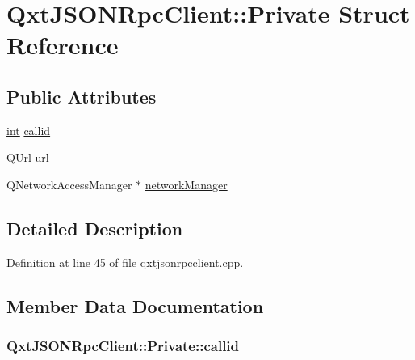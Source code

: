 \hypertarget{struct_qxt_j_s_o_n_rpc_client_1_1_private}{\section{Qxt\-J\-S\-O\-N\-Rpc\-Client\-:\-:Private Struct Reference}
\label{struct_qxt_j_s_o_n_rpc_client_1_1_private}
}
\subsection*{Public Attributes}
\begin{DoxyCompactItemize}
\item 
\hyperlink{ioapi_8h_a787fa3cf048117ba7123753c1e74fcd6}{int} \hyperlink{struct_qxt_j_s_o_n_rpc_client_1_1_private_aab2c2e58f64aeba9d949bcaa643b2fae}{callid}
\item 
Q\-Url \hyperlink{struct_qxt_j_s_o_n_rpc_client_1_1_private_adf7b52dc1d061e3b2afcaf11da4c1529}{url}
\item 
Q\-Network\-Access\-Manager $\ast$ \hyperlink{struct_qxt_j_s_o_n_rpc_client_1_1_private_a43a0336efd270343f1ea4cb024c23171}{network\-Manager}
\end{DoxyCompactItemize}


\subsection{Detailed Description}


Definition at line 45 of file qxtjsonrpcclient.\-cpp.



\subsection{Member Data Documentation}
\hypertarget{struct_qxt_j_s_o_n_rpc_client_1_1_private_aab2c2e58f64aeba9d949bcaa643b2fae}{
\subsubsection[{callid}]{ Qxt\-J\-S\-O\-N\-Rpc\-Client\-::\-Private\-::callid}}\label{struct_qxt_j_s_o_n_rpc_client_1_1_private_aab2c2e58f64aeba9d949bcaa643b2fae}


